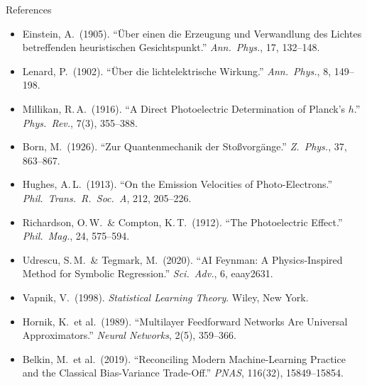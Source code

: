 \documentclass[aspectratio=169,12pt]{beamer}
\begin{document}
\begin{frame}[allowframebreaks]{References}

\small
\begin{itemize}
  \item Einstein, A.\ (1905). ``\"Uber einen die Erzeugung und Verwandlung des
    Lichtes betreffenden heuristischen Gesichtspunkt.''
    \textit{Ann.\ Phys.}, 17, 132--148.
  \item Lenard, P.\ (1902). ``\"Uber die lichtelektrische Wirkung.''
    \textit{Ann.\ Phys.}, 8, 149--198.
  \item Millikan, R.\,A.\ (1916). ``A Direct Photoelectric Determination of
    Planck's $h$.''
    \textit{Phys.\ Rev.}, 7(3), 355--388.
  \item Born, M.\ (1926). ``Zur Quantenmechanik der Sto{\ss}vorg\"ange.''
    \textit{Z.\ Phys.}, 37, 863--867.
  \item Hughes, A.\,L.\ (1913). ``On the Emission Velocities of
    Photo-Electrons.'' \textit{Phil.\ Trans.\ R.\ Soc.\ A}, 212, 205--226.
  \item Richardson, O.\,W.\ \& Compton, K.\,T.\ (1912). ``The
    Photoelectric Effect.'' \textit{Phil.\ Mag.}, 24, 575--594.
  \item Udrescu, S.\,M.\ \& Tegmark, M.\ (2020). ``AI Feynman: A
    Physics-Inspired Method for Symbolic Regression.''
    \textit{Sci.\ Adv.}, 6, eaay2631.
  \item Vapnik, V.\ (1998). \textit{Statistical Learning Theory}.
    Wiley, New York.
  \item Hornik, K.\ et al.\ (1989). ``Multilayer Feedforward Networks Are
    Universal Approximators.'' \textit{Neural Networks}, 2(5), 359--366.
  \item Belkin, M.\ et al.\ (2019). ``Reconciling Modern Machine-Learning
    Practice and the Classical Bias-Variance Trade-Off.''
    \textit{PNAS}, 116(32), 15849--15854.
\end{itemize}

\end{frame}

\end{document}
